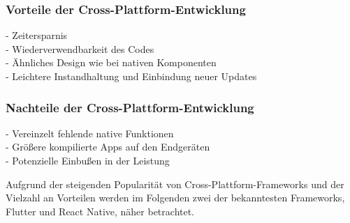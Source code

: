 \subsubsection*{Vorteile der Cross-Plattform-Entwicklung}

- Zeitersparnis \\
- Wiederverwendbarkeit des Codes \\
- Ähnliches Design wie bei nativen Komponenten \\
- Leichtere Instandhaltung und Einbindung neuer Updates \\

\subsubsection*{Nachteile der Cross-Plattform-Entwicklung}

- Vereinzelt fehlende native Funktionen \\
- Größere kompilierte Apps auf den Endgeräten \\
- Potenzielle Einbußen in der Leistung

Aufgrund der steigenden Popularität von Cross-Plattform-Frameworks und der Vielzahl an Vorteilen werden im Folgenden zwei der bekanntesten Frameworks, Flutter und React Native, näher betrachtet.
